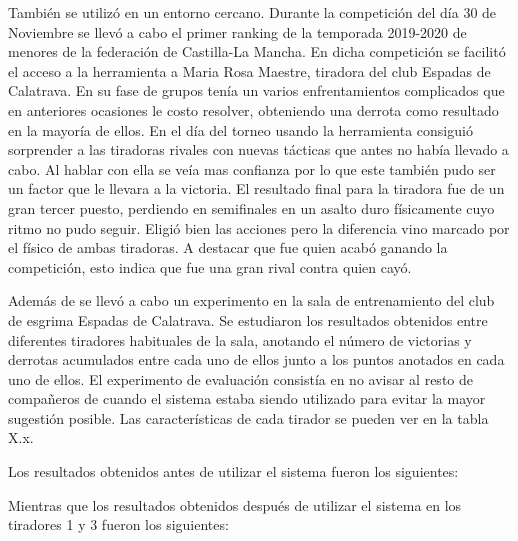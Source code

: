 
También se utilizó en un entorno cercano. Durante la competición del día 30 de Noviembre se llevó
a cabo el primer ranking de la temporada 2019-2020 de menores de la federación de Castilla-La Mancha.
En dicha competición se facilitó el acceso a la herramienta a Maria Rosa Maestre, tiradora del club
Espadas de Calatrava. En su fase de grupos tenía un varios enfrentamientos complicados que en anteriores
ocasiones le costo resolver, obteniendo una derrota como resultado en la mayoría de ellos. En el día
del torneo usando la herramienta consiguió sorprender a las tiradoras rivales con nuevas tácticas que
antes no había llevado a cabo. Al hablar con ella se veía mas confianza por lo que este también
pudo ser un factor que le llevara a la victoria. El resultado final para la tiradora fue de
un gran tercer puesto, perdiendo en semifinales en un asalto duro físicamente cuyo ritmo no pudo
seguir. Eligió bien las acciones pero la diferencia vino marcado por el físico de ambas tiradoras.
A destacar que fue quien acabó ganando la competición, esto indica que fue una gran rival contra
quien cayó.

Además de se llevó a cabo un experimento en la sala de entrenamiento del club de esgrima Espadas
de Calatrava. Se estudiaron los resultados obtenidos entre diferentes tiradores habituales de
la sala, anotando el número de victorias y derrotas acumulados entre cada uno de ellos junto
a los puntos anotados en cada uno de ellos. El experimento de evaluación consistía en no avisar
al resto de compañeros de cuando el sistema estaba siendo utilizado para evitar la mayor sugestión
posible. Las características de cada tirador se pueden ver en la tabla X.x.

Los resultados obtenidos antes de utilizar el sistema fueron los siguientes:


Mientras que los resultados obtenidos después de utilizar el sistema en los tiradores 1 y 3 fueron
los siguientes:


